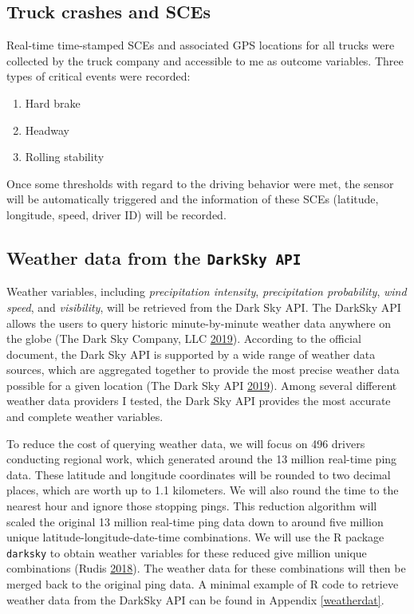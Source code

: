 \documentclass[12pt]{book}
\numberwithin{equation}{chapter}
\providecommand{\tightlist}{%
  \setlength{\itemsep}{0pt}\setlength{\parskip}{0pt}}
\begin{document}
\hypertarget{truck-crashes-and-sces}{%
\subsection{Truck crashes and SCEs}\label{truck-crashes-and-sces}}

Real-time time-stamped SCEs and associated GPS locations for all trucks were collected by the truck company and accessible to me as outcome variables. Three types of critical events were recorded:

\begin{enumerate}
\def\labelenumi{\arabic{enumi}.}
\tightlist
\item
  Hard brake
\item
  Headway
\item
  Rolling stability
\end{enumerate}

Once some thresholds with regard to the driving behavior were met, the sensor will be automatically triggered and the information of these SCEs (latitude, longitude, speed, driver ID) will be recorded.

\hypertarget{weather-data-from-the-darksky-api}{%
\subsection{\texorpdfstring{Weather data from the \texttt{DarkSky\ API}}{Weather data from the DarkSky API}}\label{weather-data-from-the-darksky-api}}

Weather variables, including \emph{precipitation intensity}, \emph{precipitation probability}, \emph{wind speed}, and \emph{visibility}, will be retrieved from the Dark Sky API.
The DarkSky API allows the users to query historic minute-by-minute weather data anywhere on the globe (The Dark Sky Company, LLC \protect\hyperlink{ref-darksky}{2019}).
According to the official document, the Dark Sky API is supported by a wide range of weather data sources, which are aggregated together to provide the most precise weather data possible for a given location (The Dark Sky API \protect\hyperlink{ref-darkskyds}{2019}).
Among several different weather data providers I tested, the Dark Sky API provides the most accurate and complete weather variables.

To reduce the cost of querying weather data, we will focus on 496 drivers conducting regional work, which generated around the 13 million real-time ping data. These latitude and longitude coordinates will be rounded to two decimal places, which are worth up to 1.1 kilometers.
We will also round the time to the nearest hour and ignore those stopping pings.
This reduction algorithm will scaled the original 13 million real-time ping data down to around five million unique latitude-longitude-date-time combinations.
We will use the R package \texttt{darksky} to obtain weather variables for these reduced give million unique combinations (Rudis \protect\hyperlink{ref-hrbrmstr}{2018}).
The weather data for these combinations will then be merged back to the original ping data.
A minimal example of R code to retrieve weather data from the DarkSky API can be found in Appendix \ref{weatherdat}.
\end{document}
